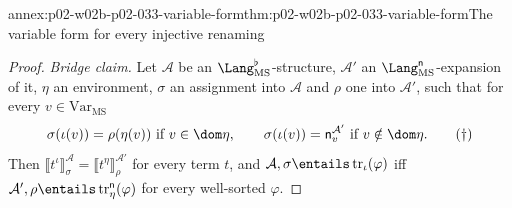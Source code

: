 \begin{annexitem}{annex:p02-w02b-p02-033-variable-form}{thm:p02-w02b-p02-033-variable-form}{The variable form for every injective renaming}
\begin{proof}
\emph{Bridge claim.}  Let \(\mathcal A\) be an
\(\Lang_{\mathrm{MS}}^{\flat}\)-structure, \(\mathcal A'\) an
\(\Lang_{\mathrm{MS}}^{\mathsf n}\)-expansion of it, \(\eta\) an environment,
\(\sigma\) an assignment into \(\mathcal A\) and \(\rho\) one into
\(\mathcal A'\), such that for every \(v\in\mathrm{Var}_{\mathrm{MS}}\)
\[
 \sigma(\iota(v))=\rho(\eta(v))\ \text{if }v\in\dom\eta,\qquad
 \sigma(\iota(v))=\mathsf n_v^{\mathcal A'}\ \text{if }v\notin\dom\eta.
 \tag{\(\dagger\)}
\]
Then \(\llbracket t^{\iota}\rrbracket^{\mathcal A}_{\sigma}=
\llbracket t^{\eta}\rrbracket^{\mathcal A'}_{\rho}\) for every term \(t\), and
\(\mathcal A,\sigma\entails\operatorname{tr}_{\iota}(\varphi)\) iff
\(\mathcal A',\rho\entails\operatorname{tr}^{\mathsf n}_{\eta}(\varphi)\) for
every well-sorted \(\varphi\).


\end{proof}
\end{annexitem}
